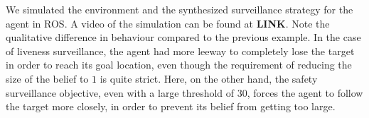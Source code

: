 We simulated the environment and the synthesized surveillance strategy for the agent in ROS. A video of the simulation can be found at \textbf{LINK}. Note the qualitative difference in behaviour compared to the previous example. In the case of liveness surveillance, the agent had more leeway to completely lose the target in order to reach its goal location, even though the requirement of reducing the size of the belief to $1$ is quite strict. Here, on the other hand, the safety surveillance objective, even with a large threshold of $30$, forces the agent to follow the target more closely, in order to prevent its belief from getting too large. 

